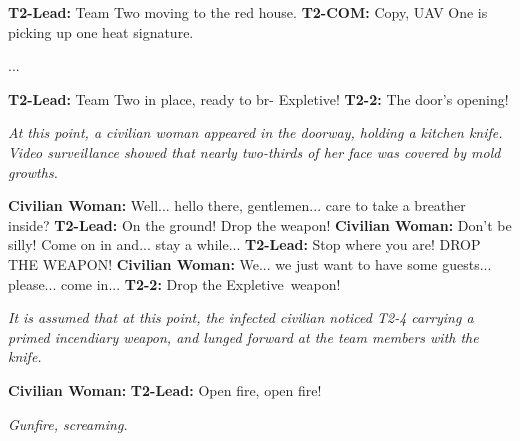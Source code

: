 \begin{leftbar}
\begin{flushleft}

\textbf{T2-Lead:} Team Two moving to the red house.\linebreak
\textbf{T2-COM:} Copy, UAV One is picking up one heat signature.\linebreak

...\linebreak

\textbf{T2-Lead:} Team Two in place, ready to br- \lb Expletive\rb!\linebreak
\textbf{T2-2:} The door's opening!\linebreak

\textsl{At this point, a civilian woman appeared in the doorway, holding a kitchen knife. Video surveillance showed that nearly two-thirds of her face was covered by mold growths.}\linebreak

\textbf{Civilian Woman:} Well... hello there, gentlemen... care to take a breather inside?\linebreak
\textbf{T2-Lead:} On the ground! Drop the weapon!\linebreak
\textbf{Civilian Woman:} Don't be silly! Come on in and... stay a while...\linebreak
\textbf{T2-Lead:} Stop where you are! DROP THE WEAPON!\linebreak
\textbf{Civilian Woman:} We... we just want to have some guests... please... come in...\linebreak
\textbf{T2-2:} Drop the \lb Expletive\rb \ weapon!\linebreak

\textsl{It is assumed that at this point, the infected civilian noticed T2-4 carrying a primed incendiary weapon, and lunged forward at the team members with the knife.}\linebreak

\textbf{Civilian Woman:} \expunged \linebreak
\textbf{T2-Lead:} Open fire, open fire!\linebreak

\textsl{Gunfire, screaming.}
\end{flushleft}
\end{leftbar}